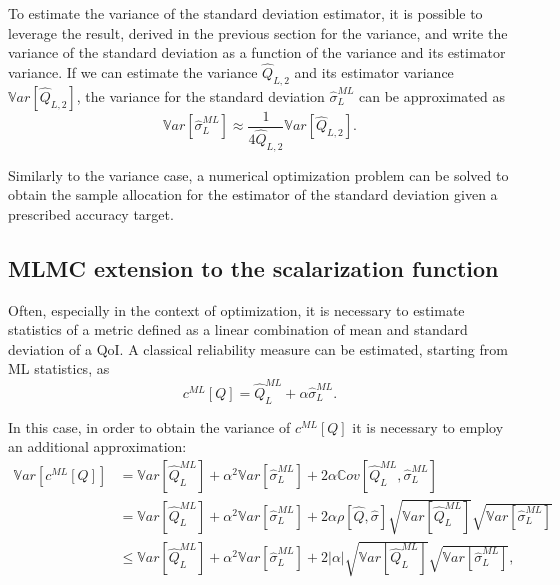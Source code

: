 To estimate the variance of the standard deviation estimator, it is possible to leverage the result, derived in the previous section for the variance, and write the variance of the standard deviation as a function of the variance and its estimator variance. If we can estimate the variance $\hat{Q}_{L,2}$ and its estimator variance $\mathbb{V}ar\left[ \hat{Q}_{L,2} \right]$, the variance for the standard deviation $\hat{\sigma}_L^{ML}$ can be approximated as
\begin{equation}
 \mathbb{V}ar\left[ \hat{\sigma}_L^{ML} \right] \approx \frac{1}{4 \hat{Q}_{L,2}} \mathbb{V}ar\left[ \hat{Q}_{L,2} \right].
\end{equation}

Similarly to the variance case, a numerical optimization problem can be solved to obtain the sample allocation for the estimator of the standard deviation given a prescribed accuracy target. 


\subsection{MLMC extension to the scalarization function}
Often, especially in the context of optimization, it is necessary to estimate statistics of a metric defined as a linear combination of mean and standard deviation of a QoI. A classical reliability measure can be estimated, starting from ML statistics, as
\begin{equation}
 c^{ML}[Q] = \hat{Q}_{L}^{ML}  + \alpha \hat{\sigma}_L^{ML}.
\end{equation}

In this case, in order to obtain the variance of $c^{ML}[Q]$ it is necessary to employ an additional approximation:
\begin{equation}
\begin{split}
 \mathbb{V}ar\left[ c^{ML}[Q] \right] &= \mathbb{V}ar\left[ \hat{Q}_{L}^{ML} \right] + \alpha^2 \mathbb{V}ar\left[ \hat{\sigma}_L^{ML} \right] 
                                      + 2 \alpha \mathbb{C}ov\left[ \hat{Q}_{L}^{ML}, \hat{\sigma}_L^{ML} \right] \\
                                      &= \mathbb{V}ar\left[ \hat{Q}_{L}^{ML} \right] + \alpha^2 \mathbb{V}ar\left[ \hat{\sigma}_L^{ML} \right] 
                                      + 2 \alpha \rho\left[\hat{Q},\hat{\sigma}\right] \sqrt{ \mathbb{V}ar\left[ \hat{Q}_{L}^{ML} \right] }  \sqrt{ \mathbb{V}ar\left[ \hat{\sigma}_L^{ML} \right] } \\
                                      &\leq \mathbb{V}ar\left[ \hat{Q}_{L}^{ML} \right] + \alpha^2 \mathbb{V}ar\left[ \hat{\sigma}_L^{ML} \right] 
                                      + 2 |\alpha| \sqrt{ \mathbb{V}ar\left[ \hat{Q}_{L}^{ML} \right] }  \sqrt{ \mathbb{V}ar\left[ \hat{\sigma}_L^{ML} \right] },
\end{split}
\end{equation}

